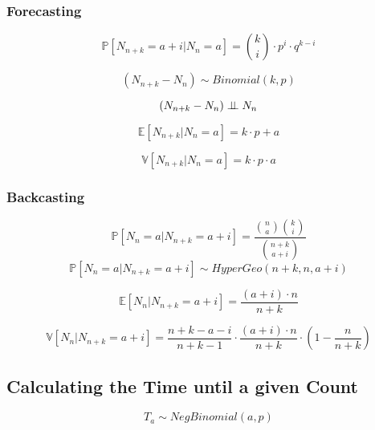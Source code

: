 \subsubsection{Forecasting}
\begin{equation*}
    \mathbb{P}[N_{n+k} = a + i | N_n = a] = 
    \binom{k}{i} \cdot p^i \cdot q^{k-i}
\end{equation*}

\begin{equation*}
    (N_{n+k} - N_n) \sim Binomial(k, p)
\end{equation*}

\begin{equation*}
    (N_{n+k} - N_n) \perp \!\!\! \perp N_n
\end{equation*}

\begin{equation*}
    \mathbb{E}[N_{n+k} | N_n = a] = k \cdot p + a
\end{equation*}

\begin{equation*}
    \mathbb{V}[N_{n+k} | N_n = a] = k \cdot p \cdot a
\end{equation*}

\subsubsection{Backcasting}
\begin{equation*}
    \mathbb{P}[N_n = a | N_{n+k} = a + i] = 
    \frac{
        \binom{n}{a} \binom{k}{i}
        }{
        \binom{n+k}{a+i}
    }
\end{equation*}
\begin{equation*}
    \mathbb{P}[N_n = a | N_{n+k} = a + i] \sim HyperGeo(n+k, n, a+i)
\end{equation*}

\begin{equation*}
    \mathbb{E}[N_n | N_{n+k} = a + i] = \frac{(a + i) \cdot n}{n + k}
\end{equation*}

\begin{equation*}
    \mathbb{V}[N_n | N_{n+k} = a + i] = 
    \frac{n + k - a - i}{n + k - 1} \cdot 
    \frac{(a + i) \cdot n}{ n + k} \cdot 
    ( 1 - \frac{n}{n + k})
\end{equation*}

\subsection{Calculating the Time until a given Count}
\begin{equation*}
    T_a \sim NegBinomial(a, p) 
\end{equation*}

